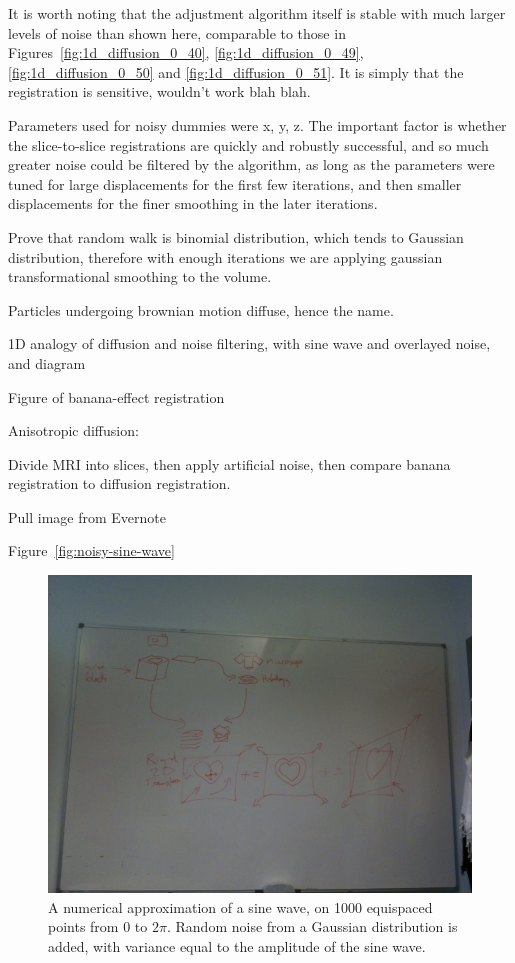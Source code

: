   It is worth noting that the adjustment algorithm itself is stable with much larger levels of noise than shown here, comparable to those in Figures~\ref{fig:1d_diffusion_0_40}, \ref{fig:1d_diffusion_0_49}, \ref{fig:1d_diffusion_0_50} and \ref{fig:1d_diffusion_0_51}. It is simply that the registration is sensitive, wouldn't work blah blah.
  
  Parameters used for noisy dummies were x, y, z. The important factor is whether the slice-to-slice registrations are quickly and robustly successful, and so much greater noise could be filtered by the algorithm, as long as the parameters were tuned for large displacements for the first few iterations, and then smaller displacements for the finer smoothing in the later iterations.
  
  Prove that random walk is binomial distribution, which tends to Gaussian distribution, therefore with enough iterations we are applying gaussian transformational smoothing to the volume.
  
  Particles undergoing brownian motion diffuse, hence the name.
  
  1D analogy of diffusion and noise filtering, with sine wave and overlayed noise, and diagram
  
  Figure of banana-effect registration
  
  Anisotropic diffusion: 
  
  Divide MRI into slices, then apply artificial noise, then compare banana registration to diffusion registration.
  
  Pull image from Evernote
  
      Figure~\ref{fig:noisy-sine-wave}
      \begin{figure}[htbp]
        \centering
        \includegraphics[height=0.7\textwidth]{Ch6/Figs/process_diagram}
        \caption{A numerical approximation of a sine wave, on 1000 equispaced points from $0$ to $2\pi$. Random noise from a Gaussian distribution is added, with variance equal to the amplitude of the sine wave.}
      \end{figure}
    
